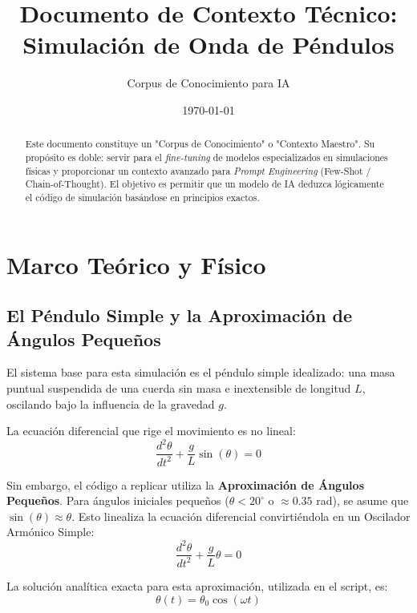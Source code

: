 \documentclass[a4paper,11pt]{article}
\title{\textbf{Documento de Contexto Técnico: \\ Simulación de Onda de Péndulos}}
\author{Corpus de Conocimiento para IA}
\date{\today}
\begin{document}
	
	\maketitle
	
	\begin{abstract}
		Este documento constituye un "Corpus de Conocimiento" o "Contexto Maestro". Su propósito es doble: servir para el \textit{fine-tuning} de modelos especializados en simulaciones físicas y proporcionar un contexto avanzado para \textit{Prompt Engineering} (Few-Shot / Chain-of-Thought). El objetivo es permitir que un modelo de IA deduzca lógicamente el código de simulación basándose en principios exactos.
	\end{abstract}
	
	\tableofcontents
	\vspace{1cm}
	
	\section{Marco Teórico y Físico}
	
	\subsection{El Péndulo Simple y la Aproximación de Ángulos Pequeños}
	El sistema base para esta simulación es el péndulo simple idealizado: una masa puntual suspendida de una cuerda sin masa e inextensible de longitud $L$, oscilando bajo la influencia de la gravedad $g$.
	
	La ecuación diferencial que rige el movimiento es no lineal:
	\begin{equation}
		\frac{d^2\theta}{dt^2} + \frac{g}{L} \sin(\theta) = 0
	\end{equation}
	
	Sin embargo, el código a replicar utiliza la \textbf{Aproximación de Ángulos Pequeños}. Para ángulos iniciales pequeños ($\theta < 20^\circ$ o $\approx 0.35$ rad), se asume que $\sin(\theta) \approx \theta$. Esto linealiza la ecuación diferencial convirtiéndola en un Oscilador Armónico Simple:
	\begin{equation}
		\frac{d^2\theta}{dt^2} + \frac{g}{L} \theta = 0
	\end{equation}
	
	La solución analítica exacta para esta aproximación, utilizada en el script, es:
	\begin{equation}
		\theta(t) = \theta_0 \cos(\omega t)
	\end{equation}
	
\end{document}
